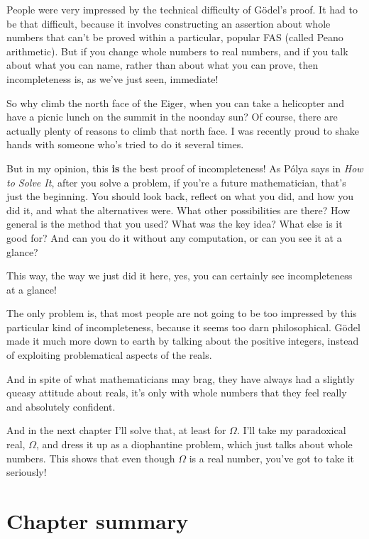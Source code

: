 \documentclass[12pt]{book}
\begin{document}
People were very impressed by the technical difficulty of G\"odel's proof.
It had to be that difficult, because it involves constructing an assertion about whole
numbers that can't be proved within a particular, popular FAS (called Peano arithmetic).
But if you change whole numbers to real numbers, and if you talk about what you can
name, rather than about what you can prove, then incompleteness is, as we've just seen, immediate!
 
So why climb
the north face of the Eiger, when you can take a helicopter and have
a picnic lunch on the summit in the noonday sun?
Of course, there are actually plenty of reasons to climb that north face.
I was recently proud to shake hands with someone who's tried to do it several times.
 
But in my opinion, this \textbf{is} the best proof of incompleteness!
As P\'olya says in \emph{How to Solve It}, after you solve a problem, 
if you're a future mathematician, that's just the beginning.
You should look back, reflect on what you did,
and how you did it, and what the alternatives were.
What other possibilities are there?
How general is the method that you used?
What was the key idea?
What else is it good for?
And can you do it without any computation,
or can you see it at a glance?
 
This way, the way we just did it here, yes, you can certainly see incompleteness at a glance!
 
The only problem is, that most people are not going to be too impressed by this particular
kind of incompleteness, because it seems too darn philosophical.
G\"odel made it much more down to earth by talking about the
positive integers, instead of exploiting problematical aspects of the reals.
 
And in spite of what mathematicians may brag, they have always had a slightly
queasy attitude about reals, it's only with whole numbers that they feel really and 
absolutely confident.
 
And in the next chapter I'll solve that, at least for $\Omega$.
I'll take my paradoxical real, $\Omega$, and dress
it up as a diophantine problem, which just talks about whole numbers.
This shows that even though $\Omega$ is a real number, you've got to take it seriously!

\section*{Chapter summary}
\end{document}
